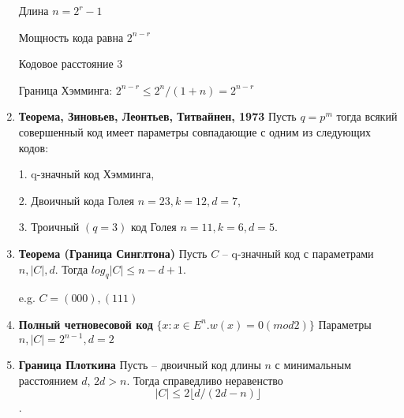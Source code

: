 \documentclass[a4paper, 12pt]{report}
\begin{document}
\begin{enumerate}
Длина $n = 2^r - 1$

Мощность кода равна $2^{n-r}$

Кодовое расстояние $3$

Граница Хэмминга: $2^{n-r} \leq 2^n/(1 + n) = 2^{n-r}$

\item \textbf{Теорема, Зиновьев, Леонтьев, Титвайнен, 1973}
Пусть $q = p^m$ тогда всякий совершенный код имеет параметры
совпадающие с одним из следующих кодов:

1. q-значный код Хэмминга,

2. Двоичный кода Голея $n = 23, k = 12, d = 7$,

3. Троичный $(q = 3)$ код Голея $n = 11, k = 6, d = 5$.

\item \textbf{Теорема (Граница Синглтона)}
Пусть $C$ – q-значный код с параметрами $n, |C|, d$. Тогда
$log_{q}|C| \leq n - d + 1$.

e.g. $C = {(000),(111)}$


\item \textbf{Полный четновесовой код}
$\{x : x \in E^n. w(x) = 0(mod 2)\}$
Параметры $n, |C| = 2^{n - 1}, d = 2$

\item \textbf{Граница Плоткина}
Пусть – двоичный код длины $n$ с минимальным расстоянием
$d$, $2d > n$. Тогда справедливо неравенство
\[ |C| \leq 2 \lfloor   d/(2d - n) \rfloor \].

\end{enumerate}
\end{document}
